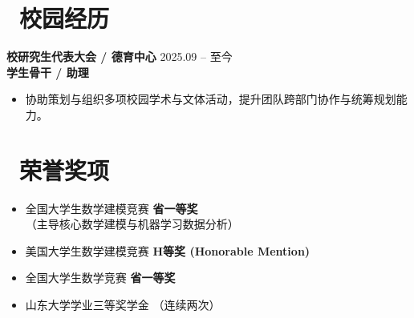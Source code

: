\documentclass[11pt]{article}
\begin{document}
\section{\makebox[\widthof{\faGroup}][c]{\color{CVBlue}\faGroup}\ 校园经历}
\textbf{校研究生代表大会 / 德育中心} \hfill 2025.09 -- 至今\\[0.1em]
\textbf{学生骨干 / 助理} \hfill 
\begin{itemize}[nosep]
    \item 协助策划与组织多项校园学术与文体活动，提升团队跨部门协作与统筹规划能力。
\end{itemize}

\section{\makebox[\widthof{\faList}][c]{\color{CVBlue}\faList}\ 荣誉奖项}
\begin{itemize}[nosep]
    \item 全国大学生数学建模竞赛 \textbf{省一等奖}（主导核心数学建模与机器学习数据分析） \hfill 
    \item 美国大学生数学建模竞赛 \textbf{H等奖 (Honorable Mention)} \hfill 
    \item 全国大学生数学竞赛 \textbf{省一等奖} \hfill 
    \item 山东大学学业三等奖学金 （连续两次） \hfill 
\end{itemize}
\end{document}
